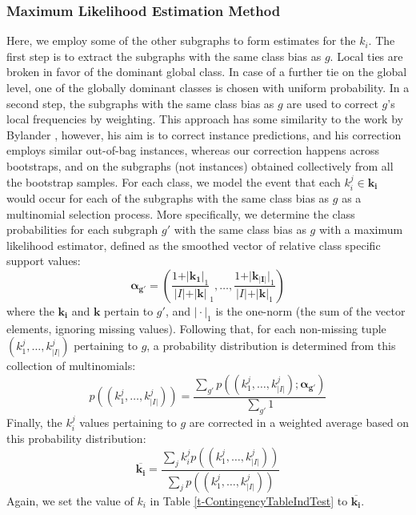 \documentclass{sig-alternate}
\begin{document}
\subsubsection{Maximum Likelihood Estimation Method}
\label{ss:MLE}
Here, we employ some of the other subgraphs to form estimates for the $k_i$.
The first step is to extract the subgraphs with the same class
bias as $g$. Local ties are broken in
favor of the dominant global class. In case of a further tie on the global
level, one of the globally dominant classes is chosen with uniform probability.
In a second step, the subgraphs with the same class bias as $g$ are used to correct
$g$'s local frequencies by weighting. This approach has some similarity to the
work by Bylander \cite{bylander02estimating}, however, his aim is to correct
instance predictions, and his correction employs similar out-of-bag instances,
whereas our correction happens across bootstraps, and on the subgraphs (not
instances) obtained collectively from all the bootstrap samples. For each
class, we model the event that each $k_i^j \in \mathbf{k_i}$ would occur for
each of the subgraphs with the same class bias as $g$ as a multinomial
selection process. More specifically, we determine the class probabilities for
each subgraph $g'$ with the same class bias as $g$ with a maximum likelihood
estimator, defined as the smoothed vector of relative class specific support values:
\begin{equation}
  \mathbf{\alpha_{g'}} = \left(\frac{1+\vert\mathbf{k_1}\vert_1}{\vert I\vert+\vert\mathbf{k}\vert}_1,\ldots,\frac{1+\vert\mathbf{k_{\vert I\vert}}\vert_1}{\vert I\vert+\vert\mathbf{k}\vert_1}\right)
  \label{eqn:mlexpr}
\end{equation}
where the $\mathbf{k_i}$ and $\mathbf{k}$ pertain to $g'$, and $\vert\cdot\vert_1$ is the one-norm (the sum of the vector elements, ignoring missing values). Following that, for
each non-missing tuple $(k_1^j,\ldots,k_{\vert I\vert}^j)$ pertaining to $g$, a probability distribution is
determined from this collection of multinomials:
\begin{equation}
  p((k_1^j,\ldots,k_{\vert I\vert}^j))=\frac{\sum_{g'} p((k_1^j,\ldots,k_{\vert I\vert}^j); \mathbf{\alpha_{g'}})}{\sum_{g'}1}
  \label{eqn:avgpr}
\end{equation}
Finally, the $k_i^j$ values pertaining to $g$ are corrected in a weighted average
based on this probability distribution:
\begin{equation}
  \overline{\mathbf{k_i}}=\frac{\sum_j k_i^j p((k_1^j,\ldots,k_{\vert I\vert}^j))}{\sum_j p((k_1^j,\ldots,k_{\vert I\vert}^j))}
  \label{eqn:avgki}
\end{equation}
Again, we set the value of $k_i$ in Table \ref{t-ContingencyTableIndTest} to $\overline{\mathbf{k_i}}$.
\end{document}

